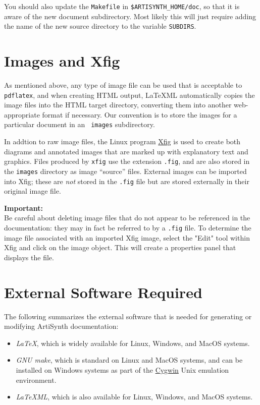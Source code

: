 \documentclass{article}
\begin{document}
You should also update the {\tt Makefile} in {\tt \$ARTISYNTH\_HOME/doc},
so that it is aware of the new document subdirectory. Most
likely this will just require adding the name of the new source
directory to the variable {\tt SUBDIRS}.

\section{Images and Xfig}
\label{ImagesSec}

As mentioned above, any type of image file can be used that is
acceptable to {\tt pdflatex}, and when creating HTML output, LaTeXML
automatically copies the image files into the HTML target directory,
converting them into another web-appropriate format if necessary.  Our
convention is to store the images for a particular document in an {\tt
images} subdirectory.

In addtion to raw image files, the Linux program
\href{http://www.xfig.org}{Xfig} is used to create both diagrams and
annotated images that are marked up with explanatory text and
graphics.  Files produced by {\tt xfig} use the extension {\tt .fig},
and are also stored in the {\tt images} directory as image ``source''
files.  External images can be imported into Xfig; these are {\it not}
stored in the {\tt .fig} file but are stored externally in their
original image file.

\begin{sideblock}
{\bf Important:}\\ Be careful about deleting image files that do not
appear to be referenced in the documentation: they may in fact be
referred to by a {\tt .fig} file.  To determine the image file
associated with an imported Xfig image, select the "Edit" tool within
Xfig and click on the image object.  This will create a properties
panel that displays the file.
\end{sideblock}

\section{External Software Required}
\label{ExternalSoftwareSec}

The following summarizes the external software that
is needed for generating or modifying ArtiSynth
documentation:

\begin{itemize}

\item {\it LaTeX}, which is widely available for Linux, Windows,
and MacOS systems.

\item {\it GNU make}, which is standard on Linux and MacOS systems,
and can be installed on Windows systems as part of the 
\href{http://www.cygwin.com}{Cygwin} Unix emulation environment.

\item {\it LaTeXML}, which is also available for Linux, Windows, and
MacOS systems.  

\end{itemize}
\end{document}
